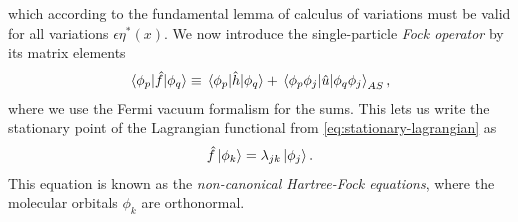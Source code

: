             which according to the fundamental lemma of calculus of variations
            \cite{jost1998calculus} must be valid for all variations
            $\epsilon\eta^{*}(x)$.
            We now introduce the single-particle \emph{Fock operator} by
            its matrix elements
            \begin{align}
                \mel*{\phi_p}{\hat{f}}{\phi_q}
                \equiv
                \mel*{\phi_p}{\hat{h}}{\phi_q}
                +
                \mel*{\phi_p\phi_j}{\hat{u}}{\phi_q\phi_j}_{AS},
                \label{eq:fock-mel}
            \end{align}
            where we use the Fermi vacuum formalism for the sums.
            This lets us write the stationary point of the Lagrangian functional
            from \autoref{eq:stationary-lagrangian} as
            \begin{align}
                \hat{f}\ket*{\phi_k}
                = \lambda_{jk}\ket*{\phi_j}.
                \label{eq:non-canonical-hartree-fock}
            \end{align}
            This equation is known as the \emph{non-canonical Hartree-Fock
            equations}, where the molecular orbitals $\phi_k$ are orthonormal.

